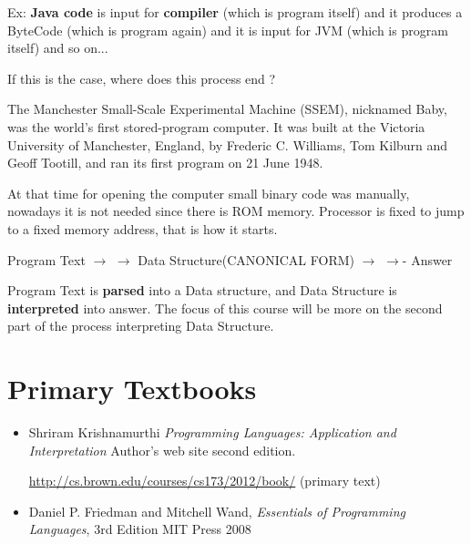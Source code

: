 \documentclass{article}
\begin{document}
\begin{flushleft}
\noindent
Ex: \textbf{Java code} is input for \textbf{compiler} (which is program itself) and it produces a ByteCode (which is program again) and it is input for JVM (which is program itself) and so on...

\noindent
If this is the case, where does this process end ? 

\noindent
The Manchester Small-Scale Experimental Machine (SSEM), nicknamed Baby, was the world's first stored-program computer. It was built at the Victoria University of Manchester, England, by Frederic C. Williams, Tom Kilburn and Geoff Tootill, and ran its first program on 21 June 1948.

\noindent
At that time for opening the computer small binary code was manually, nowadays it is not needed since there is ROM memory. Processor is fixed to jump to a fixed memory address, that is how it starts. 
                
Program Text  $\rightarrow$ $\rightarrow$ Data Structure(CANONICAL FORM)  $\rightarrow$ $\rightarrow$- Answer 

Program Text is \textbf{parsed} into a Data structure, and Data Structure is \textbf{interpreted} into answer. The focus of this course will be more on the second part of the process interpreting Data Structure.

\end{flushleft}


\section*{Primary Textbooks}
\begin{itemize}


\item Shriram Krishnamurthi \emph{Programming Languages: Application and Interpretation} Author's web site  second edition. 

\url{http://cs.brown.edu/courses/cs173/2012/book/} (primary text)

\item Daniel P. Friedman and Mitchell Wand, \emph{Essentials of Programming Languages}, 3rd Edition MIT Press 2008
\end{itemize}
\end{document}
